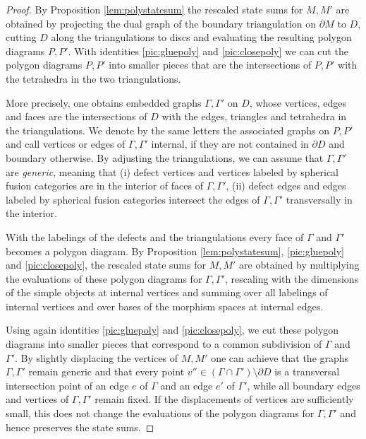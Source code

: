 \documentclass[1.5pt, a4paper]{article}
\begin{document}
\begin{proof}
By Proposition \ref{lem:polystatesum} the rescaled state sums for $M,M'$ are obtained by  projecting the dual graph of the boundary triangulation on $\partial M$ to $D$,  cutting $D$ along the triangulations to discs and evaluating the resulting  polygon diagrams $P,P'$. With identities \eqref{pic:gluepoly} and \eqref{pic:closepoly}  we can cut the polygon diagrams $P,P'$ into smaller pieces that are the intersections of $P,P'$ with the tetrahedra in the two  triangulations. 

More precisely, one obtains embedded graphs $\Gamma,\Gamma'$  on $D$, whose vertices, edges and faces are the intersections of $D$ with the edges, triangles and tetrahedra in the triangulations.   We denote by the same letters the associated graphs  on $P,P'$ and call  vertices or edges of $\Gamma,\Gamma'$ internal, if they are not contained in $\partial D$ and boundary otherwise.   By adjusting the triangulations, we can assume that $\Gamma,\Gamma'$ are \emph{generic}, meaning that
(i) defect vertices  and vertices labeled by  spherical fusion categories 
 are in the interior of faces of $\Gamma,\Gamma'$,
(ii) defect edges and edges labeled by spherical fusion categories intersect the edges of $\Gamma,\Gamma'$ transversally in the interior. 

With the labelings of the defects and the triangulations every face of $\Gamma$ and $\Gamma'$ becomes a polygon diagram. 
By Proposition \ref{lem:polystatesum},   \eqref{pic:gluepoly} and \eqref{pic:closepoly}, the rescaled state sums for $M,M'$  are
  obtained by multiplying the evaluations of these polygon diagrams for $\Gamma,\Gamma'$, rescaling with the dimensions of the simple objects at internal vertices and summing  over all  labelings of  internal vertices and over bases of the morphism spaces at internal edges.
 
Using again identities \eqref{pic:gluepoly} and \eqref{pic:closepoly}, we cut these polygon diagrams into smaller pieces that correspond to a common subdivision of $\Gamma$ and $\Gamma'$.  By slightly displacing the vertices of $M,M'$  one can achieve that the graphs $\Gamma,\Gamma'$ remain generic  and that  every  point $v''\in (\Gamma\cap \Gamma')\setminus \partial D$ is a transversal intersection point of an edge $e$ of $\Gamma$ and an edge $e'$  of $\Gamma'$, while all boundary edges and vertices of $\Gamma,\Gamma'$ remain fixed.  If the displacements of vertices  are sufficiently small, this does not change the evaluations of the polygon diagrams for $\Gamma,\Gamma'$ and hence preserves the state sums.


\end{proof}
\end{document}
